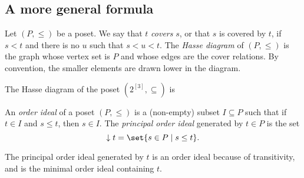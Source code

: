 \subsection*{A more general formula}
Let $(P, \le)$ be a poset.
We say that $t$ \emph{covers} $s$, or that $s$ is covered by $t$, if $s < t$ and
there is no $u$ such that $s < u < t$.
The \emph{Hasse diagram} of $(P, \le)$ is the graph whose vertex set is $P$
and whose edges are the cover relations.
By convention, the smaller elements are drawn lower in the diagram.
\begin{example}
    The Hasse diagram of the poset $(2^{[3]}, \subseteq)$ is
    \begin{center}
    \end{center}
\end{example}

\begin{definition*} \label{def:poset:order_ideal}
    An \emph{order ideal} of a poset $(P, \le)$ is a (non-empty) subset 
    $I \subseteq P$ such that if $t \in I$ and $s \le t$, then $s \in I$.
    The \emph{principal order ideal} generated by $t \in P$ is the set \[
        \downarrow t = \set{s \in P \mid s \le t}.
    \]
\end{definition*}
The principal order ideal generated by $t$ is an order ideal because of
transitivity, and is the minimal order ideal containing $t$.

